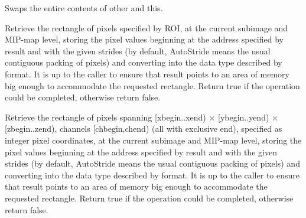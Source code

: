 Swaps the entire contents of {\cf other} and {\cf this}.
\apiend

Retrieve the rectangle of pixels specified by ROI, at the current subimage
and MIP-map level, storing the pixel values beginning at the address
specified by {\cf result} and with the given strides (by default, {\cf
AutoStride} means the usual contiguous packing of pixels) and converting
into the data type described by {\cf format}.  It is up to the caller to
ensure that {\cf result} points to an area of memory big enough to
accommodate the requested rectangle. Return {\cf true} if the operation
could be completed, otherwise return {\cf false}.
\apiend


Retrieve the rectangle of pixels spanning {\cf [xbegin..xend)} $\times$
{\cf [ybegin..yend)} $\times$ {\cf [zbegin..zend)}, channels 
{\cf [chbegin,chend)} (all with exclusive
end), specified as integer pixel coordinates, at the current subimage and
MIP-map level, storing the pixel values beginning at the address
specified by {\cf result} and with the given strides (by default,
{\cf AutoStride} means the usual contiguous packing of pixels) and
converting into the data type described by {\cf format}.  It is
up to the caller to ensure that {\cf result} points to an area of
memory big enough to accommodate the requested rectangle.
Return {\cf true} if the operation could be completed, otherwise
return {\cf false}.
\apiend


